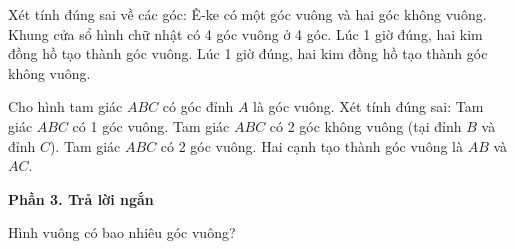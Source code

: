 \begin{ex} %
Xét tính đúng sai về các góc:
\choiceTF
{\True Ê-ke có một góc vuông và hai góc không vuông.}
{\True Khung cửa sổ hình chữ nhật có 4 góc vuông ở 4 góc.}
{Lúc 1 giờ đúng, hai kim đồng hồ tạo thành góc vuông.}
{\True Lúc 1 giờ đúng, hai kim đồng hồ tạo thành góc không vuông.}
\end{ex}

\begin{ex} %
Cho hình tam giác $ABC$ có góc đỉnh $A$ là góc vuông. Xét tính đúng sai:
\choiceTF
{\True Tam giác $ABC$ có 1 góc vuông.}
{\True Tam giác $ABC$ có 2 góc không vuông (tại đỉnh $B$ và đỉnh $C$).}
{Tam giác $ABC$ có 2 góc vuông.}
{\True Hai cạnh tạo thành góc vuông là $AB$ và $AC$.}
\end{ex}

\textbf{Phần 3. Trả lời ngắn}

\begin{ex} %
Hình vuông có bao nhiêu góc vuông?
\end{ex}

